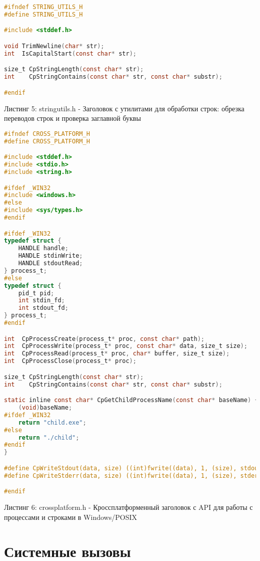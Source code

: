 \begin{lstlisting}[language=C]
#ifndef STRING_UTILS_H
#define STRING_UTILS_H

#include <stddef.h>

void TrimNewline(char* str);
int  IsCapitalStart(const char* str);

size_t CpStringLength(const char* str);
int    CpStringContains(const char* str, const char* substr);

#endif
\end{lstlisting}
Листинг 5: stringutils.h - Заголовок с утилитами для обработки строк: обрезка переводов строк и проверка заглавной буквы

\begin{lstlisting}[language=C]
#ifndef CROSS_PLATFORM_H
#define CROSS_PLATFORM_H

#include <stddef.h>
#include <stdio.h>
#include <string.h>

#ifdef _WIN32
#include <windows.h>
#else
#include <sys/types.h>
#endif

#ifdef _WIN32
typedef struct {
    HANDLE handle;
    HANDLE stdinWrite;
    HANDLE stdoutRead;
} process_t;
#else
typedef struct {
    pid_t pid;
    int stdin_fd;
    int stdout_fd;
} process_t;
#endif

int  CpProcessCreate(process_t* proc, const char* path);
int  CpProcessWrite(process_t* proc, const char* data, size_t size);
int  CpProcessRead(process_t* proc, char* buffer, size_t size);
int  CpProcessClose(process_t* proc);

size_t CpStringLength(const char* str);
int    CpStringContains(const char* str, const char* substr);

static inline const char* CpGetChildProcessName(const char* baseName) {
    (void)baseName;
#ifdef _WIN32
    return "child.exe";
#else
    return "./child";
#endif
}

#define CpWriteStdout(data, size) ((int)fwrite((data), 1, (size), stdout))
#define CpWriteStderr(data, size) ((int)fwrite((data), 1, (size), stderr))

#endif
\end{lstlisting}
Листинг 6: crossplatform.h - Кроссплатформенный заголовок с API для работы с процессами и строками в Windows/POSIX


\section{Системные вызовы}

